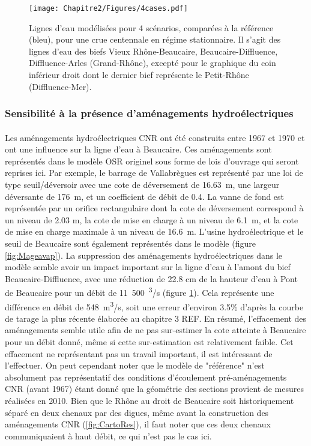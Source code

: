 	\begin{figure}[h]
		\centering
		\texttt{[image: Chapitre2/Figures/4cases.pdf]}
        \caption{Lignes d'eau modélisées pour 4 scénarios, comparées à la référence (bleu), pour une crue centennale en régime stationnaire. Il s'agit des lignes d'eau des biefs Vieux Rhône-Beaucaire, Beaucaire-Diffluence, Diffluence-Arles (Grand-Rhône), excepté pour le graphique du coin inférieur droit dont le dernier bief représente le Petit-Rhône (Diffluence-Mer).}
		\label{fig:Sensib4}
	\end{figure}		
				
\FloatBarrier	

	\subsubsection{Sensibilité à la présence d'aménagements hydroélectriques}
	
		\paragraph{} Les aménagements hydroélectriques CNR ont été construits entre 1967 et 1970 et ont une influence sur la ligne d'eau à Beaucaire. Ces aménagements sont représentés dans le modèle OSR originel \citep{launay_zabr-osr_2017} sous forme de lois d'ouvrage qui seront reprises ici. Par exemple, le barrage de Vallabrègues est représenté par une loi de type seuil/déversoir avec une cote de déversement de 16.63~m, une largeur déversante de 176~m, et un coefficient de débit de 0.4. La vanne de fond est représentée par un orifice rectangulaire dont la cote de déversement correspond à un niveau de 2.03 m, la cote de mise en charge à un niveau de 6.1~m, et la cote de mise en charge maximale à un niveau de 16.6~m. L'usine hydroélectrique et le seuil de Beaucaire sont également représentés dans le modèle (figure \ref{fig:Mageavap}). La suppression des aménagements hydroélectriques dans le modèle semble avoir un impact important sur la ligne d'eau à l'amont du bief Beaucaire-Diffluence, avec une réduction de 22.8 cm de la hauteur d'eau à Pont de Beaucaire pour un débit de 11~500~\textsuperscript{3}/s (figure \ref{fig:Sensib4}). Cela représente une différence en débit de 548~m\textsuperscript{3}/s, soit une erreur d'environ 3.5\% d'après la courbe de tarage la plus récente élaborée au chapitre 3 REF. En résumé, l'effacement des aménagements semble utile afin de ne pas sur-estimer la cote atteinte à Beaucaire pour un débit donné, même si cette sur-estimation est relativement faible. Cet effacement ne représentant pas un travail important, il est intéressant de l'effectuer. On peut cependant noter que le modèle de "référence" n'est absolument pas représentatif des conditions d'écoulement pré-aménagements CNR (avant 1967) étant donné que la géométrie des sections provient de mesures réalisées en 2010. Bien que le Rhône au droit de Beaucaire soit historiquement séparé en deux chenaux par des digues, même avant la construction des aménagements CNR (\ref{fig:CartoRes}), il faut noter que ces deux chenaux communiquaient à haut débit, ce qui n'est pas le cas ici. 
		
